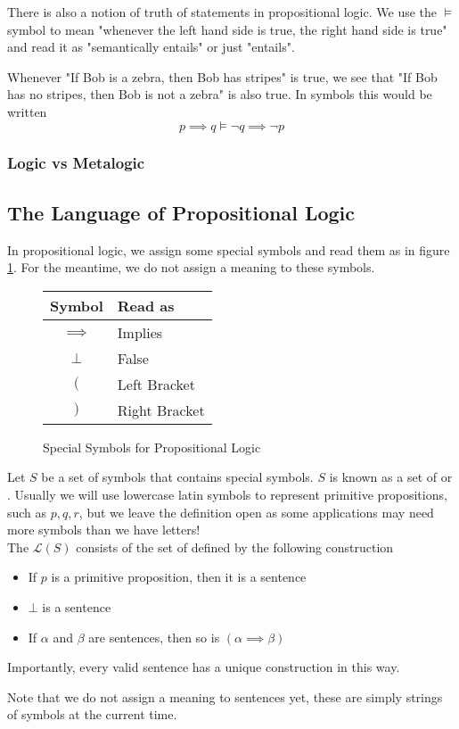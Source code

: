 \documentclass[11pt]{article}
\begin{document}
There is also a notion of truth of statements in propositional logic. We use the $\vDash$ symbol to mean "whenever the left hand side is true, the right hand side is true" and read it as "semantically entails" or just "entails".
\begin{eg}
    Whenever "If Bob is a zebra, then Bob has stripes" is true, we see that "If Bob has no stripes, then Bob is not a zebra" is also true. In symbols this would be written
    \[p \implies q \vDash \neg q \implies \neg p\]
\end{eg} 

\subsubsection{Logic vs Metalogic}

\pagebreak
\subsection{The Language of Propositional Logic}
In propositional logic, we assign some special symbols and read them as in figure \ref{fig:specialSymbolsProp}. For the meantime, we do not assign a meaning to these symbols.
\begin{figure}[H]
    \caption{Special Symbols for Propositional Logic}
    \label{fig:specialSymbolsProp}
    \centering
    \begin{tabular}{|c|l|}
        \hline
        Symbol & Read as \\ \hline \hline
        $\implies$ & Implies \\ \hline
        $\bot$ & False \\ \hline
        $($ & Left Bracket \\ \hline
        $)$ & Right Bracket \\ \hline
    \end{tabular}
\end{figure}
\begin{defi}
    Let $S$ be a set of symbols that contains special symbols. $S$ is known as a set of  or . Usually we will use lowercase latin symbols to represent primitive propositions, such as $p,q,r$, but we leave the definition open as some applications may need more symbols than we have letters!\\ The  $\mathcal{L}(S)$ consists of the set of  defined by the following construction
    \begin{itemize}
        \item If $p$ is a primitive proposition, then it is a sentence
        \item $\bot$ is a sentence
        \item If $\alpha$ and $\beta$ are sentences, then so is $(\alpha \implies \beta)$
    \end{itemize}
    Importantly, every valid sentence has a unique construction in this way.
\end{defi}
Note that we do not assign a meaning to sentences yet, these are simply strings of symbols at the current time. 
\printindex
\end{document}
